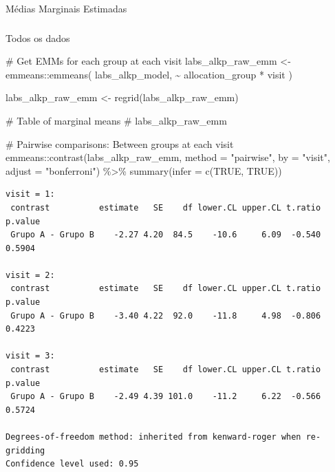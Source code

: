 \documentclass[
  12pt,
]{article}
\makeatletter
\let\oldparagraph\paragraph
\renewcommand{\paragraph}{
    \@ifstar
      \xxxParagraphStar
      \xxxParagraphNoStar
  }
\newcommand{\xxxParagraphStar}[1]{\oldparagraph*{#1}\mbox{}}
\newcommand{\xxxParagraphNoStar}[1]{\oldparagraph{#1}\mbox{}}
\let\oldsubparagraph\subparagraph
\renewcommand{\subparagraph}{
    \@ifstar
      \xxxSubParagraphStar
      \xxxSubParagraphNoStar
  }
\newcommand{\xxxSubParagraphStar}[1]{\oldsubparagraph*{#1}\mbox{}}
\newcommand{\xxxSubParagraphNoStar}[1]{\oldsubparagraph{#1}\mbox{}}
\newenvironment{Shaded}{\begin{snugshade}}{\end{snugshade}}
\newcommand{\AttributeTok}[1]{\textcolor[rgb]{0.40,0.45,0.13}{#1}}
\newcommand{\CommentTok}[1]{\textcolor[rgb]{0.37,0.37,0.37}{#1}}
\newcommand{\ConstantTok}[1]{\textcolor[rgb]{0.56,0.35,0.01}{#1}}
\newcommand{\FunctionTok}[1]{\textcolor[rgb]{0.28,0.35,0.67}{#1}}
\newcommand{\NormalTok}[1]{\textcolor[rgb]{0.00,0.23,0.31}{#1}}
\newcommand{\OtherTok}[1]{\textcolor[rgb]{0.00,0.23,0.31}{#1}}
\newcommand{\SpecialCharTok}[1]{\textcolor[rgb]{0.37,0.37,0.37}{#1}}
\newcommand{\StringTok}[1]{\textcolor[rgb]{0.13,0.47,0.30}{#1}}
\makeatother
\begin{document}
\paragraph{Médias Marginais
Estimadas}\label{muxe9dias-marginais-estimadas-3}

\subparagraph{Todos os dados}\label{todos-os-dados-3}

\begin{Shaded}
\begin{Highlighting}[]
\CommentTok{\# Get EMMs for each group at each visit }
\NormalTok{labs\_alkp\_raw\_emm }\OtherTok{\textless{}{-}}\NormalTok{ emmeans}\SpecialCharTok{::}\FunctionTok{emmeans}\NormalTok{(}
\NormalTok{    labs\_alkp\_model, }
    \SpecialCharTok{\textasciitilde{}}\NormalTok{ allocation\_group }\SpecialCharTok{*}\NormalTok{ visit}
\NormalTok{)}

\NormalTok{labs\_alkp\_raw\_emm }\OtherTok{\textless{}{-}} \FunctionTok{regrid}\NormalTok{(labs\_alkp\_raw\_emm)}

\CommentTok{\# Table of marginal means}
\CommentTok{\# labs\_alkp\_raw\_emm}

\CommentTok{\# Pairwise comparisons: Between groups at each visit}
\NormalTok{emmeans}\SpecialCharTok{::}\FunctionTok{contrast}\NormalTok{(labs\_alkp\_raw\_emm,}
\AttributeTok{method =} \StringTok{"pairwise"}\NormalTok{, }\AttributeTok{by =} \StringTok{"visit"}\NormalTok{,}
\AttributeTok{adjust =} \StringTok{"bonferroni"}\NormalTok{) }\SpecialCharTok{\%\textgreater{}\%} \FunctionTok{summary}\NormalTok{(}\AttributeTok{infer =} \FunctionTok{c}\NormalTok{(}\ConstantTok{TRUE}\NormalTok{, }\ConstantTok{TRUE}\NormalTok{))}
\end{Highlighting}
\end{Shaded}

\begin{verbatim}
visit = 1:
 contrast          estimate   SE    df lower.CL upper.CL t.ratio p.value
 Grupo A - Grupo B    -2.27 4.20  84.5    -10.6     6.09  -0.540  0.5904

visit = 2:
 contrast          estimate   SE    df lower.CL upper.CL t.ratio p.value
 Grupo A - Grupo B    -3.40 4.22  92.0    -11.8     4.98  -0.806  0.4223

visit = 3:
 contrast          estimate   SE    df lower.CL upper.CL t.ratio p.value
 Grupo A - Grupo B    -2.49 4.39 101.0    -11.2     6.22  -0.566  0.5724

Degrees-of-freedom method: inherited from kenward-roger when re-gridding 
Confidence level used: 0.95 
\end{verbatim}
\end{document}
